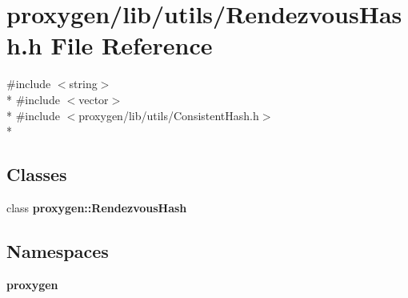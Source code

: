 \section{proxygen/lib/utils/\+Rendezvous\+Hash.h File Reference}
\label{RendezvousHash_8h}
{\ttfamily \#include $<$string$>$}\\*
{\ttfamily \#include $<$vector$>$}\\*
{\ttfamily \#include $<$proxygen/lib/utils/\+Consistent\+Hash.\+h$>$}\\*
\subsection*{Classes}
\begin{DoxyCompactItemize}
\item 
class {\bf proxygen\+::\+Rendezvous\+Hash}
\end{DoxyCompactItemize}
\subsection*{Namespaces}
\begin{DoxyCompactItemize}
\item 
 {\bf proxygen}
\end{DoxyCompactItemize}
